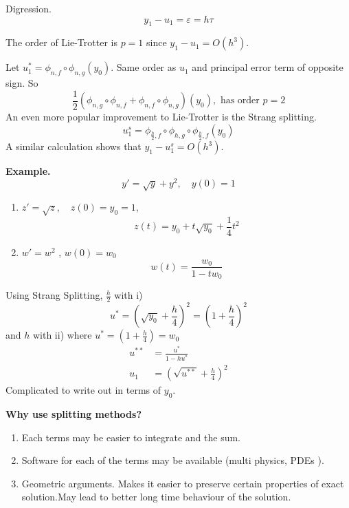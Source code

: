 \documentclass{article}
\theoremstyle{remark}
\newcommand{\newpara}
  {
  \vskip 0.4cm
  }
\begin{document}
     \begin{tcolorbox}
       Digression. \[
       y_{1} - u_{1} = \varepsilon = h \tau 
       \] 
     \end{tcolorbox}
The order of Lie-Trotter is $p=1$ since $y_{1} - u_{1} = O\left( h^3 \right)$.

\newpara

Let $u^{*}_{1} = \phi _{n,f} \circ \phi _{n,g} \left( y_{0} \right)$. Same order as $u_{1}$ and principal error term of opposite sign. So \[
\frac{1}{2} \left( \phi _{n,g} \circ  \phi _{n,f} + \phi _{n,f} \circ \phi _{n,g} \right)\left( y_{0} \right) , \text{ has order } p= 2
\] 
An even more popular improvement to Lie-Trotter is the Strang splitting. \[
u_{1}^{s} = \phi _{\frac{h}{2}, f} \circ \phi _{h,g} \circ \phi _{\frac{h}{2}, f}\left( y_{0} \right)
\] 
A similar calculation shows that $y_{1} - u_{1} ^{s} = O\left( h^3 \right)$. 

\newpara

\textbf{Example.}  \[
y'  = \sqrt{y}  + y^2, \quad y\left( 0 \right) = 1 
\] 
\begin{enumerate}[label=(\roman*)]
  \item $z' = \sqrt{z}  , \quad  z\left( 0 \right) = y_{0} = 1 $, \[
  z\left( t \right) = y_{0} + t \sqrt{y_{0}}  + \frac{1}{4} t ^2  \] 
\item $w'  = w ^2 $ , $ w\left( 0 \right) = w_{0} $ \[
w\left( t \right) = \frac{w_{0}}{1- tw_{0}} 
\] 
\end{enumerate}

Using Strang Splitting, $\frac{h}{2}$ with  i)\[
u^{*} = \left( \sqrt{y_{0}}  + \frac{h}{4} \right) ^2 = \left( 1 + \frac{h}{4} \right)^2
\] 
and $h$ with ii) where $u^{*} = \left( 1 + \frac{h}{4} \right) = w_{0}$ \[
  \begin{split}
u^{* * }  & = \frac{u^{*}}{ 1- h u^{*}}  \\
u_{1}  & = \left( \sqrt{u^{* * }} + \frac{h}{4}  \right) ^2
  \end{split} 
\] 
Complicated to write out in terms of $y_{0}$.  


\newpara
\textbf{Why use splitting methods?} 
\begin{enumerate}[label=(\roman*)]
  \item Each terms may be easier to integrate and the sum. 
  \item Software for each of the terms may be available (multi physics, PDEs ).
  \item Geometric arguments. Makes it easier to preserve certain properties of exact solution.May lead to better long time behaviour of the solution. 
\end{enumerate}
\end{document}
